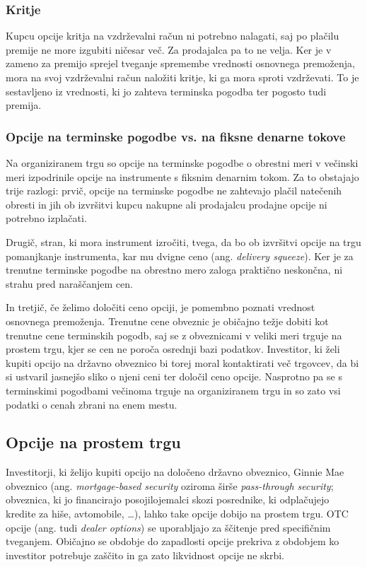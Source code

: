 \documentclass[a4paper]{article}
\begin{document}
\subsubsection{Kritje}
Kupcu opcije kritja na vzdrževalni račun ni potrebno nalagati, saj po plačilu premije ne more izgubiti ničesar več. Za prodajalca pa to
ne velja. Ker je v zameno za premijo sprejel tveganje spremembe vrednosti osnovnega premoženja, mora na svoj vzdrževalni račun
naložiti kritje, ki ga mora sproti vzdrževati. To je sestavljeno iz vrednosti, ki jo zahteva terminska pogodba ter pogosto tudi premija.

\subsubsection{Opcije na terminske pogodbe vs. na fiksne denarne tokove} \label{futuresvsphysicals}
Na organiziranem trgu so opcije na terminske pogodbe o obrestni meri v večinski meri izpodrinile opcije na instrumente s fiksnim
denarnim tokom. Za to obstajajo trije razlogi: prvič, opcije na terminske pogodbe ne zahtevajo plačil natečenih obresti in jih ob izvršitvi kupcu
nakupne ali prodajalcu prodajne opcije ni potrebno izplačati.

Drugič, stran, ki mora instrument izročiti, tvega, da bo ob izvršitvi opcije na trgu pomanjkanje instrumenta, kar mu dvigne ceno (ang. \textit{delivery squeeze}).
Ker je za trenutne terminske pogodbe na obrestno mero zaloga praktično neskončna, ni strahu pred naraščanjem cen. 

In tretjič, če želimo določiti ceno opciji, je pomembno poznati vrednost osnovnega premoženja.
Trenutne cene obveznic je običajno težje dobiti kot trenutne cene terminskih pogodb, saj se z obveznicami v veliki meri trguje na prostem trgu, kjer
se cen ne poroča osrednji bazi podatkov. Investitor, ki želi kupiti opcijo na državno obveznico bi torej moral kontaktirati več trgovcev, 
da bi si ustvaril jasnejšo sliko o njeni ceni ter določil ceno opcije. Nasprotno pa se s terminskimi pogodbami večinoma trguje na organiziranem trgu in so zato vsi 
podatki o cenah zbrani na enem mestu. 

\subsection{Opcije na prostem trgu}
Investitorji, ki želijo kupiti opcijo na določeno državno obveznico, Ginnie Mae obveznico (ang. \textit{mortgage-based security} oziroma širše \textit{pass-through security};
obveznica, ki jo financirajo posojilojemalci skozi posrednike, ki odplačujejo kredite za hiše, avtomobile, \ldots), lahko take opcije dobijo na prostem trgu.
OTC opcije (ang. tudi \textit{dealer options}) se uporabljajo za ščitenje pred specifičnim tveganjem. Običajno se obdobje do zapadlosti opcije prekriva z obdobjem 
ko investitor potrebuje zaščito in ga zato likvidnost opcije ne skrbi.
\end{document}
